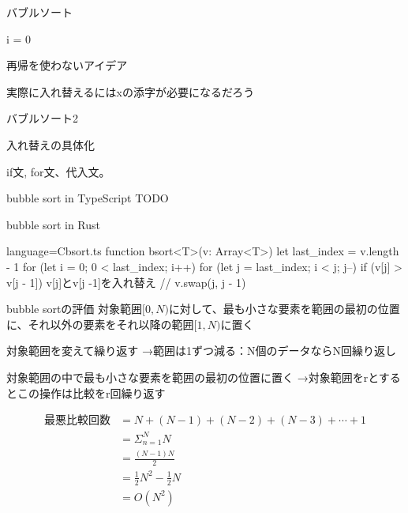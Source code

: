 \documentclass{beamer}
\begin{document}
\begin{frame}[fragile]{バブルソート}{}
\begin{algorithm}[H]
\BlankLine
i = 0
\caption[page]{再帰を使わないアイデア}
\end{algorithm}

実際に入れ替えるにはxの添字が必要になるだろう
\end{frame}

\begin{frame}[fragile]{バブルソート2}{}
\begin{algorithm}[H]
\BlankLine
{}
\caption[page]{入れ替えの具体化}
\end{algorithm}
\vfill
if文, for文、代入文。
\end{frame}

\begin{frame}[fragile]{bubble sort in TypeScript}{}
TODO
\end{frame}

\begin{frame}[fragile]{bubble sort in Rust}{}
\begin{codeof}{language=C}{bsort.ts}
function bsort<T>(v: Array<T>) {
  let last_index = v.length - 1
  for (let i = 0; 0 < last_index; i++) {
    for (let j = last_index; i < j; j--) {
      if (v[j] > v[j - 1]) {
        v[j]とv[j -1]を入れ替え // v.swap(j, j - 1)
      }
    }
  }
}
\end{codeof}
\end{frame}

\begin{frame}[fragile]{bubble sortの評価}{}
対象範囲$[0, N)$に対して、最も小さな要素を範囲の最初の位置に、それ以外の要素をそれ以降の範囲$[1, N)$に置く

対象範囲を変えて繰り返す
→範囲は1ずつ減る：N個のデータならN回繰り返し


対象範囲の中で最も小さな要素を範囲の最初の位置に置く
→対象範囲をrとするとこの操作は比較をr回繰り返す

\begin{align*}
最悪比較回数 &= N + (N - 1) + (N - 2) + (N - 3) + \cdots + 1 \\
&= \Sigma_{n=1}^{N}N \\
&= \frac{(N-1)N}{2} \\
&= \frac{1}{2}N^2 - \frac{1}{2}N \\
&= O(N^2)
\end{align*}

\end{frame}
\end{document}
